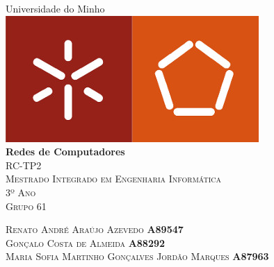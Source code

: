 \documentclass{article}
\begin{document}
\begin{capa}
	\begin{center}
	\vspace*{1.0cm}
	\huge{Universidade do Minho}\\
	[1.0cm]
	\includegraphics{logo.jpg}\\
	[1.5cm]
	\huge{\textbf{Redes de Computadores}}\\
	[0.5cm]
	\textsc{RC-TP2}\\
	\textsc{\normalsize{Mestrado Integrado em Engenharia Informática}}\\
	\textsc{\normalsize{3º Ano}}\\
	\textsc{\normalsize{Grupo 61}}\\
	[12.0cm]
	\end{center}
	\begin{flushleft}
	\textsc{Renato André Araújo Azevedo \textbf{\hspace*{130pt} A89547}}\\
	\textsc{Gonçalo Costa de Almeida \textbf{\hspace*{151pt} A88292}}\\
	\textsc{Maria Sofia Martinho Gonçalves Jordão Marques \textbf{\hspace*{30pt} A87963}}\\
	\end{flushleft}
\end{capa}

\newpage
\tableofcontents
\newpage
\end{document}
